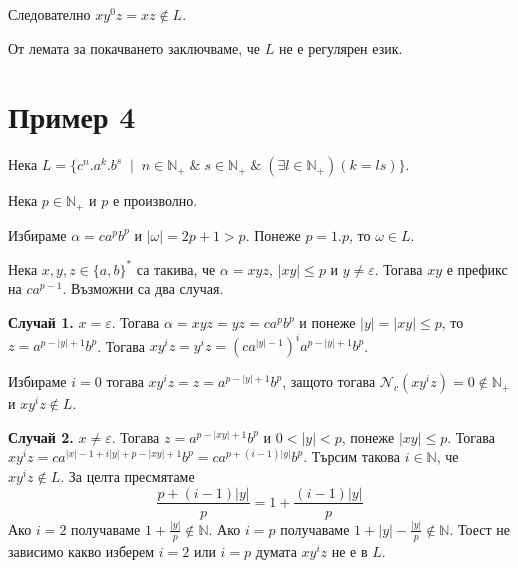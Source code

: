 \documentclass[12pt]{article}
\begin{document}
\vspace*{5mm}

\par Следователно \(xy^0z = xz \notin L\).

\vspace*{4mm}

\par От лемата за покачването заключваме, че \(L\) не е регулярен език.

\section{Пример 4}

Нека \(L = \{c^n.a^k.b^s \; \mid\; n \in \mathbb{N}_+ \;\&\; s \in \mathbb{N}_+ \;\&\; (\exists l \in \mathbb{N}_+)(k = ls)\}\).

\vspace*{5mm}

Нека \(p \in \mathbb{N}_+\) и \(p\) е произволно.

\vspace*{5mm}

Избираме \(\alpha = ca^pb^p\) и \(|\omega| = 2p + 1 > p\).
Понеже \(p = 1.p\), то \(\omega \in L\).

\vspace*{5mm}

\par Нека \(x, y, z \in \{a, b\}^*\) са такива, че \(\alpha = xyz\), \(|xy| \leq p\) и \(y \neq \varepsilon\).
Тогава \(xy\) е префикс на \(ca^{p - 1}\). Възможни са два случая.

\vspace*{5mm}

\par \textbf{Случай 1.} \(x = \varepsilon\). Тогава \(\alpha = xyz = yz = ca^pb^p\) и понеже \(|y| = |xy| \leq p\), то 
\(z = a^{p - |y| + 1}b^p\). Тогава \(xy^iz = y^iz = (ca^{|y| - 1})^ia^{p - |y| + 1}b^p\).

Избираме \(i = 0\) тогава \(xy^iz = z = a^{p - |y| + 1}b^p\), защото тогава \(\mathcal{N}_c(xy^iz) = 0 \notin \mathbb{N}_+\) и \(xy^iz \notin L\). 

\vspace*{5mm}

\par \textbf{Случай 2.} \(x \neq \varepsilon\). Тогава \(z = a^{p - |xy| + 1}b^p\) и \(0 < |y| < p\), понеже \(|xy| \leq p\).
Тогава \(xy^iz = ca^{|x| - 1 + i|y| + p - |xy| + 1}b^p = ca^{p + (i - 1)|y|}b^p\).
Търсим такова \(i \in \mathbb N\), че \(xy^iz \notin L\). За целта пресмятаме \[\displaystyle\frac{p + (i - 1)|y|}{p} = 1 + \displaystyle\frac{(i - 1)|y|}{p}\]
Ако \(i = 2\) получаваме \(1 + \displaystyle\frac{|y|}{p} \notin \mathbb N\).
Ако \(i = p\) получаваме \(1 + |y| - \displaystyle\frac{|y|}{p} \notin \mathbb N\).
Тоест не зависимо какво изберем \(i = 2\) или \(i = p\) думата \(xy^iz\) не е в \(L\).
\end{document}
